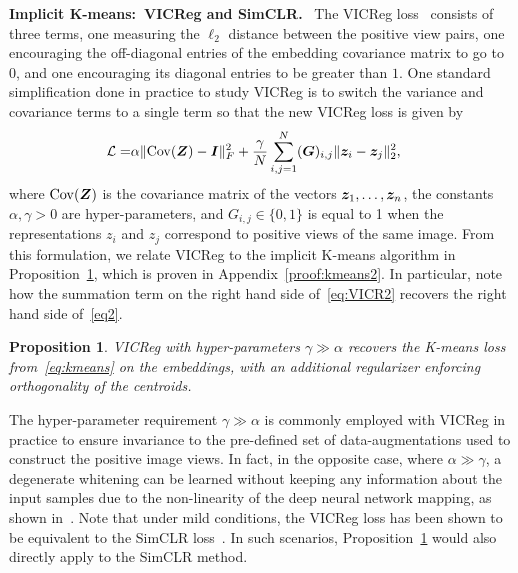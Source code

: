 \documentclass{article} %
\newtheorem{proposition}{Proposition}
\begin{document}
{\bf Implicit K-means:~VICReg and SimCLR.}~
The VICReg loss~\citep{bardes2021vicreg} consists of three terms, one measuring the $\ell_2$ distance between the positive view pairs, one encouraging the off-diagonal entries of the embedding covariance matrix to go to $0$, and one encouraging its diagonal entries to be greater than $1$.
One standard simplification done in practice to study VICReg is to switch the variance and covariance terms to a single term so that the new VICReg loss is given by
\begin{align}
    \mathcal{L}=&\alpha \|\mathrm{Cov}({\bm{Z}}) - {\bm{I}} \|_F^2 +\frac{\gamma}{N} \sum_{i,j=1}^{N}({\bm{G}})_{i,j}\|{\bm{z}}_{i}-{\bm{z}}_{j}\|_2^2,\label{eq:VICR2}
\end{align}
where $\mathrm{Cov}({\bm{Z}})$ is the covariance matrix of the vectors ${\bm{z}}_1,\ldots,{\bm{z}}_n$, the constants $\alpha, \gamma > 0$ are hyper-parameters, and $G_{i,j} \in \{0,1\}$ is equal to 1 when the representations $z_i$ and $z_j$ correspond to positive views of the same image.
From this formulation, we relate VICReg to the implicit K-means algorithm in Proposition~\ref{prop:vicreg}, which is proven in Appendix~\ref{proof:kmeans2}.
In particular, note how the summation term on the right hand side of~\eqref{eq:VICR2} recovers the right hand side of~\eqref{eq2}.

\begin{proposition}
\label{prop:vicreg}
    VICReg with hyper-parameters $\gamma \gg \alpha$ recovers the K-means loss from~\eqref{eq:kmeans} on the embeddings, with an additional regularizer enforcing orthogonality of the centroids.
\end{proposition}
The hyper-parameter requirement $\gamma \gg \alpha$ is commonly employed with VICReg in practice to ensure invariance to the pre-defined set of data-augmentations used to construct the positive image views.
In fact, in the opposite case, where $\alpha \gg \gamma$, a degenerate whitening can be learned without keeping any information about the input samples due to the non-linearity of the deep neural network mapping, as shown in~\citet{balestriero2022contrastive}.
Note that under mild conditions, the VICReg loss has been shown to be equivalent to the SimCLR loss~\citep{garrido2022duality}.
In such scenarios, Proposition~\ref{prop:vicreg} would also directly apply to the SimCLR method.
\end{document}
